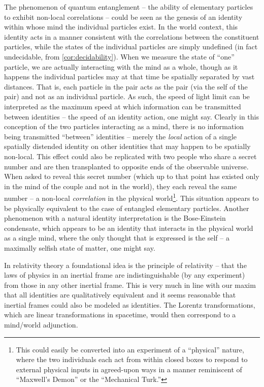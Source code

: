 \documentclass[pra,twocolumn,groupedaddress,10pt]{revtex4}
\theoremstyle{definition}
\begin{document}
The phenomenon of quantum entanglement -- the ability of elementary particles to exhibit non-local correlations -- could be seen as the genesis of an identity within whose mind the individual particles exist. In the world context, this identity acts in a manner consistent with the correlations between the constituent particles, while the states of the individual particles are simply undefined (in fact undecidable, from \autoref{cor:decidability}). When we measure the state of ``one'' particle, we are actually interacting with the mind as a whole, though as it happens the individual particles may at that time be spatially separated by vast distances. That is, each particle in the pair acts as the pair (via the self of the pair) and not as an individual particle. As such, the speed of light limit can be interpreted as the maximum speed at which information can be transmitted between identities -- the speed of an identity action, one might say. Clearly in this conception of the two particles interacting as a mind, there is no information being transmitted ``between'' identities -- merely the \textit{local} action of a single spatially distended identity on other identities that may happen to be spatially non-local. This effect could also be replicated with two people who share a secret number and are then transplanted to opposite ends of the observable universe. When asked to reveal this secret number (which up to that point has existed only in the mind of the couple and not in the world), they each reveal the same number -- a non-local \textit{correlation} in the physical world\footnote{This could easily be converted into an experiment of a ``physical'' nature, where the two individuals each act from within closed boxes to respond to external physical inputs in agreed-upon ways in a manner reminiscent of ``Maxwell's Demon'' or the ``Mechanical Turk.''}. This situation appears to be physically equivalent to the case of entangled elementary particles. Another phenomenon with a natural identity interpretation is the Bose-Einstein condensate, which appears to be an identity that interacts in the physical world as a single mind, where the only thought that is expressed is the self -- a maximally selfish state of matter, one might say.

In relativity theory a foundational idea is the principle of relativity -- that the laws of physics in an inertial frame are indistinguishable (by any experiment) from those in any other inertial frame. This is very much in line with our maxim that all identities are qualitatively equivalent and it seems reasonable that inertial frames could also be modeled as identities. The Lorentz transformations, which are linear transformations in spacetime, would then correspond to a mind/world adjunction.
\end{document}
